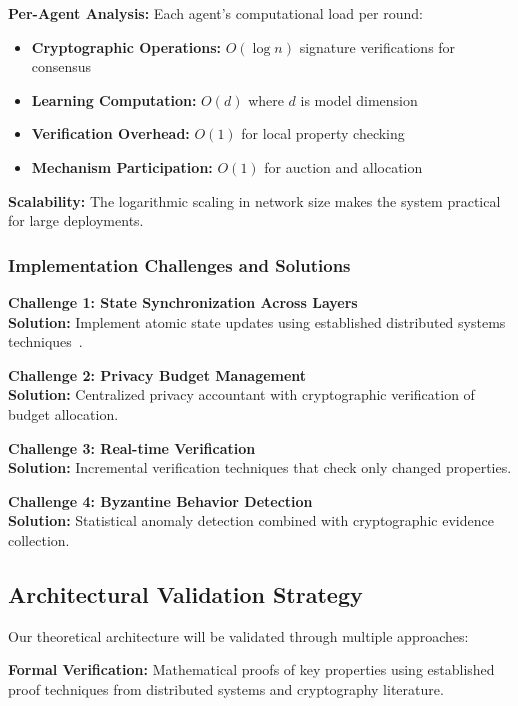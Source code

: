 \documentclass[conference]{IEEEtran}
\begin{document}
\textbf{Per-Agent Analysis:} Each agent's computational load per round:
\begin{itemize}
    \item \textbf{Cryptographic Operations:} $O(\log n)$ signature verifications for consensus
    \item \textbf{Learning Computation:} $O(d)$ where $d$ is model dimension
    \item \textbf{Verification Overhead:} $O(1)$ for local property checking
    \item \textbf{Mechanism Participation:} $O(1)$ for auction and allocation
\end{itemize}

\textbf{Scalability:} The logarithmic scaling in network size makes the system practical for large deployments.

\subsubsection{Implementation Challenges and Solutions}

\textbf{Challenge 1: State Synchronization Across Layers}\\
\textbf{Solution:} Implement atomic state updates using established distributed systems techniques~\cite{lynch1996distributed}.

\textbf{Challenge 2: Privacy Budget Management}\\
\textbf{Solution:} Centralized privacy accountant with cryptographic verification of budget allocation.

\textbf{Challenge 3: Real-time Verification}\\
\textbf{Solution:} Incremental verification techniques that check only changed properties.

\textbf{Challenge 4: Byzantine Behavior Detection}\\
\textbf{Solution:} Statistical anomaly detection combined with cryptographic evidence collection.

\subsection{Architectural Validation Strategy}

Our theoretical architecture will be validated through multiple approaches:

\textbf{Formal Verification:} Mathematical proofs of key properties using established proof techniques from distributed systems and cryptography literature.
\end{document}
